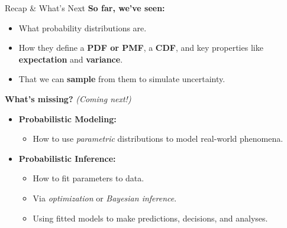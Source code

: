 \documentclass{beamer}
\begin{document}
\begin{frame}{Recap \& What’s Next}
\textbf{So far, we've seen:}
\begin{itemize}
  \item What probability distributions are.
  \item How they define a \textbf{PDF or PMF}, a \textbf{CDF}, and key properties like \textbf{expectation} and \textbf{variance}.
  \item That we can \textbf{sample} from them to simulate uncertainty.
\end{itemize}

\vspace{1em}
\textbf{What’s missing?} \textit{(Coming next!)}
\begin{itemize}
  \item \textbf{Probabilistic Modeling:}
    \begin{itemize}
      \item How to use \textit{parametric} distributions to model real-world phenomena.
    \end{itemize}
  \item \textbf{Probabilistic Inference:}
    \begin{itemize}
      \item How to fit parameters to data.
      \item Via \textit{optimization} or \textit{Bayesian inference}.
      \item Using fitted models to make predictions, decisions, and analyses.
    \end{itemize}
\end{itemize}
\end{frame}
\end{document}
